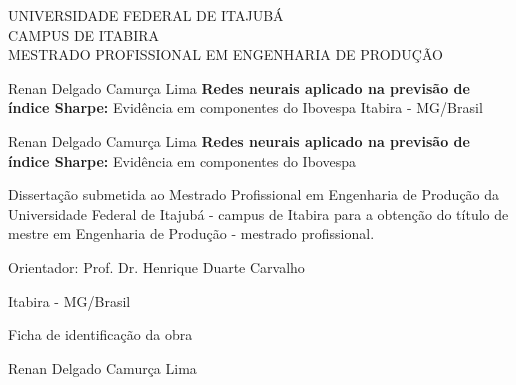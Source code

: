 \documentclass[12pt, a4paper]{article}
\newcommand{\AuthorName}{Renan Delgado Camurça Lima}
\newcommand{\Title}{\textbf{Redes neurais aplicado na previsão de índice Sharpe: }}
\newcommand{\Subtitle}{Evidência em componentes do Ibovespa}
\newcommand{\Location}{Itabira - MG/Brasil}
\newcommand{\Year}{2023}
\newcommand{\Supervisor}{Prof. Dr. Henrique Duarte Carvalho}
\begin{document}
    
        \onehalfspacing \begin{center}
            UNIVERSIDADE FEDERAL DE ITAJUBÁ\\
            CAMPUS DE ITABIRA \\
            MESTRADO PROFISSIONAL EM ENGENHARIA DE PRODUÇÃO 
        \end{center}
        \vspace{5cm}
        \center \AuthorName
        \vspace{5cm}
        \center \Title \Subtitle
        \null\vfil
        \center \Location
        \center \Year
        \pagestyle{empty}
        \pagebreak

        \center \AuthorName
        \vspace{9cm}
        \center \Title \Subtitle

        \vspace{4cm}
        \begin{changemargin}{8cm}{0cm} 
            \begin{fontsize}{10}{12} \selectfont
                Dissertação submetida ao Mestrado Profissional em Engenharia de Produção da Universidade Federal de Itajubá - campus de Itabira para a obtenção do título de mestre em Engenharia de Produção - mestrado profissional.  
                
                Orientador: \Supervisor
            \end{fontsize}
        \end{changemargin}
        \null\vfil
        \center \Location
        \center \Year
        \pagebreak

        \center

        \null\vfil \vspace{12cm}

        Ficha de identificação da obra

        \pagebreak

        \center
        \AuthorName
        \vspace{1cm}
\end{document}
